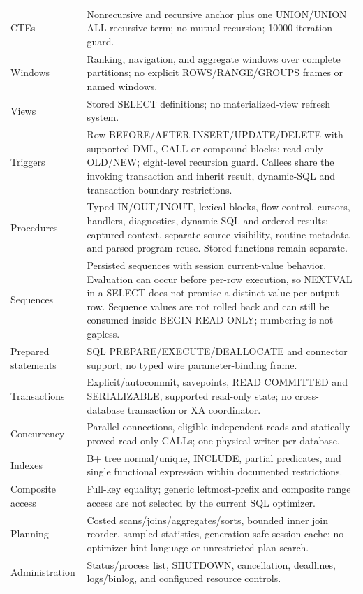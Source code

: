 \begin{longtable}{p{.27\linewidth}p{.64\linewidth}}
CTEs & Nonrecursive and recursive anchor plus one UNION/UNION ALL recursive term; no mutual recursion; 10000-iteration guard. \\
Windows & Ranking, navigation, and aggregate windows over complete partitions; no explicit ROWS/RANGE/GROUPS frames or named windows. \\
Views & Stored SELECT definitions; no materialized-view refresh system. \\
Triggers & Row BEFORE/AFTER INSERT/UPDATE/DELETE with supported DML, CALL or compound blocks; read-only OLD/NEW; eight-level recursion guard. Callees share the invoking transaction and inherit result, dynamic-SQL and transaction-boundary restrictions. \\
Procedures & Typed IN/OUT/INOUT, lexical blocks, flow control, cursors, handlers, diagnostics, dynamic SQL and ordered results; captured context, separate source visibility, routine metadata and parsed-program reuse. Stored functions remain separate. \\
Sequences & Persisted sequences with session current-value behavior. Evaluation can occur before per-row execution, so NEXTVAL in a SELECT does not promise a distinct value per output row. Sequence values are not rolled back and can still be consumed inside BEGIN READ ONLY; numbering is not gapless. \\
Prepared statements & SQL PREPARE/EXECUTE/DEALLOCATE and connector support; no typed wire parameter-binding frame. \\
Transactions & Explicit/autocommit, savepoints, READ COMMITTED and SERIALIZABLE, supported read-only state; no cross-database transaction or XA coordinator. \\
Concurrency & Parallel connections, eligible independent reads and statically proved read-only CALLs; one physical writer per database. \\
Indexes & B+ tree normal/unique, INCLUDE, partial predicates, and single functional expression within documented restrictions. \\
Composite access & Full-key equality; generic leftmost-prefix and composite range access are not selected by the current SQL optimizer. \\
Planning & Costed scans/joins/aggregates/sorts, bounded inner join reorder, sampled statistics, generation-safe session cache; no optimizer hint language or unrestricted plan search. \\
Administration & Status/process list, SHUTDOWN, cancellation, deadlines, logs/binlog, and configured resource controls. \\

\end{longtable}
